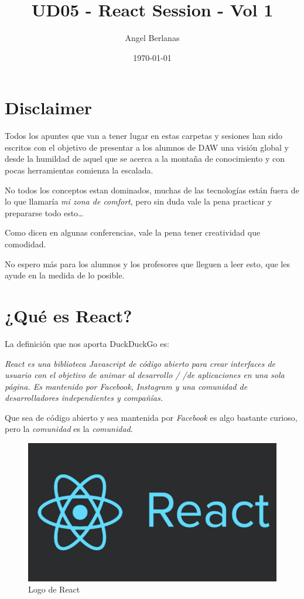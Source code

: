 \documentclass[11pt]{article}
\author{Angel Berlanas}
\date{\today}
\title{UD05 - React Session - Vol 1}
\begin{document}
\maketitle
\tableofcontents


\section{Disclaimer}
\label{sec:orgddb02e2}

Todos los apuntes que van a tener lugar en estas carpetas y sesiones 
han sido escritos con el objetivo de presentar a los alumnos de DAW una visión 
global y desde la humildad de aquel que se acerca a la montaña de conocimiento 
y con pocas herramientas comienza la escalada.

No todos los conceptos estan dominados, muchas de las tecnologías están fuera
de lo que llamaría \emph{mi zona de comfort}, pero sin duda vale la pena practicar
y prepararse todo esto\ldots{} 

Como dicen en algunas conferencias, vale la pena tener creatividad que
comodidad.

No espero más para los alumnos y los profesores que lleguen a leer esto, que
les ayude en la medida de lo posible.

\section{¿Qué es React?}
\label{sec:org47a3c40}

La definición que nos aporta DuckDuckGo es: 

\emph{React es una biblioteca Javascript de código abierto para crear}
\emph{interfaces de usuario con el objetivo de animar al desarrollo /
/de aplicaciones en una sola  página. Es mantenido por Facebook,}
\emph{Instagram y una comunidad de}
\emph{desarrolladores independientes y compañías.}

Que sea de código abierto y sea mantenida por \emph{Facebook} es algo bastante
curioso, pero la \emph{comunidad} es la \emph{comunidad}.

\begin{figure}[htbp]
\centering
\includegraphics[width=.9\linewidth]{./imgs/react-logo.png}
\caption{Logo de React}
\end{figure}
\end{document}
